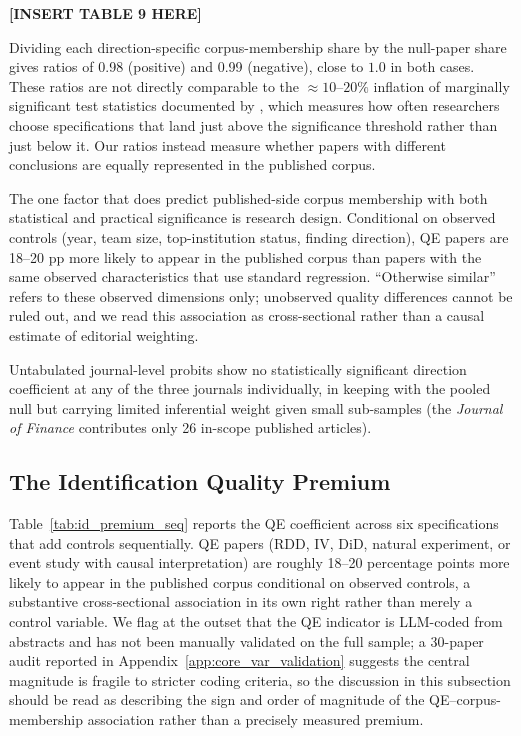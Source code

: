 \documentclass[12pt]{article}
\newcommand{\JF}{\textit{Journal of Finance}}
\begin{document}
\begin{center}
\textbf{[INSERT TABLE 9 HERE]}
\end{center}

Dividing each direction-specific corpus-membership share by the
null-paper share gives ratios of 0.98 (positive) and 0.99 (negative), close to $1.0$ in both cases.  These ratios are not directly
comparable to the $\approx 10$--$20\%$ inflation of marginally
significant test statistics documented by \citet*{Brodeur2016}, which
measures how often researchers choose specifications that land just
above the significance threshold rather than just below it.  Our
ratios instead measure whether papers with different conclusions are
equally represented in the published corpus.

The one factor that does predict published-side corpus membership with
both statistical and practical significance is research design.
Conditional on observed controls (year, team size, top-institution
status, finding direction), QE papers are 18--20 pp more likely to
appear in the published corpus than papers with the same observed
characteristics that use standard regression.  ``Otherwise similar''
refers to these observed dimensions only; unobserved quality
differences cannot be ruled out, and we read this association as
cross-sectional rather than a causal estimate of editorial weighting.

Untabulated journal-level probits show no statistically significant
direction coefficient at any of the three journals individually,
in keeping with the pooled null but carrying limited inferential weight
given small sub-samples (the \JF{} contributes only 26 in-scope
published articles).

\subsection{The Identification Quality Premium}
\label{subsec:id_premium}

Table~\ref{tab:id_premium_seq} reports the QE coefficient across six
specifications that add controls sequentially.  QE papers (RDD, IV,
DiD, natural experiment, or event study with causal interpretation)
are roughly 18--20 percentage points more likely to appear in the
published corpus conditional on observed controls, a substantive
cross-sectional association in its own right rather than merely a
control variable.  We flag at the outset that the QE indicator is
LLM-coded from abstracts and has not been manually validated on the
full sample; a 30-paper audit reported in
Appendix~\ref{app:core_var_validation} suggests the central
magnitude is fragile to stricter coding criteria, so the discussion
in this subsection should be read as describing the sign and order
of magnitude of the QE--corpus-membership association rather than a
precisely measured premium.
\end{document}
